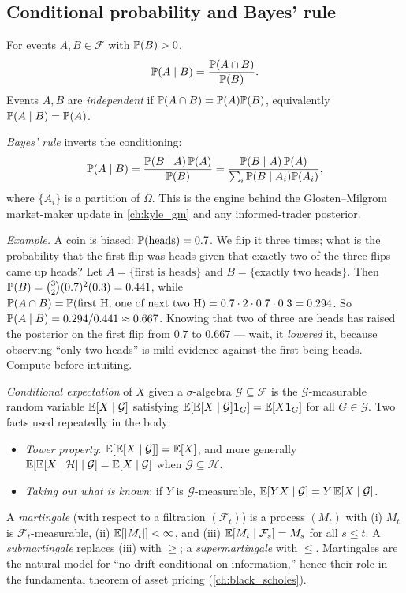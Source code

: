 \subsection{Conditional probability and Bayes' rule}

For events $A, B \in \mathcal{F}$ with $\mathbb{P}(B) > 0$,
\[
\mathbb{P}(A \mid B) = \frac{\mathbb{P}(A \cap B)}{\mathbb{P}(B)}.
\]
Events $A,B$ are \emph{independent} if $\mathbb{P}(A \cap B) = \mathbb{P}(A)\mathbb{P}(B)$,
equivalently $\mathbb{P}(A \mid B) = \mathbb{P}(A)$.

\emph{Bayes' rule} inverts the conditioning:
\[
\mathbb{P}(A \mid B) = \frac{\mathbb{P}(B \mid A)\,\mathbb{P}(A)}{\mathbb{P}(B)}
                = \frac{\mathbb{P}(B \mid A)\,\mathbb{P}(A)}
                       {\sum_i \mathbb{P}(B \mid A_i)\mathbb{P}(A_i)},
\]
where $\{A_i\}$ is a partition of $\Omega$. This is the engine behind
the Glosten--Milgrom market-maker update in \cref{ch:kyle_gm} and any
informed-trader posterior.

\emph{Example.} A coin is biased: $\mathbb{P}(\text{heads}) = 0.7$. We flip it
three times; what is the probability that the first flip was heads given
that exactly two of the three flips came up heads? Let $A = \{\text{first
is heads}\}$ and $B = \{\text{exactly two heads}\}$. Then
$\mathbb{P}(B) = \binom{3}{2}(0.7)^2(0.3) = 0.441$, while
$\mathbb{P}(A \cap B) = \mathbb{P}(\text{first H, one of next two H})
= 0.7 \cdot 2 \cdot 0.7 \cdot 0.3 = 0.294$. So
$\mathbb{P}(A \mid B) = 0.294 / 0.441 \approx 0.667$. Knowing that two of
three are heads has raised the posterior on the first flip from $0.7$
to $0.667$ --- wait, it \emph{lowered} it, because observing ``only
two heads'' is mild evidence against the first being heads. Compute
before intuiting.

\emph{Conditional expectation} of $X$ given a $\sigma$-algebra
$\mathcal{G} \subseteq \mathcal{F}$ is the $\mathcal{G}$-measurable
random variable $\mathbb{E}[X \mid \mathcal{G}]$ satisfying
$\mathbb{E}[\mathbb{E}[X \mid \mathcal{G}] \mathbf{1}_G] = \mathbb{E}[X \mathbf{1}_G]$ for all
$G \in \mathcal{G}$. Two facts used repeatedly in the body:
\begin{itemize}
  \item \emph{Tower property}: $\mathbb{E}[\mathbb{E}[X \mid \mathcal{G}]] = \mathbb{E}[X]$,
        and more generally $\mathbb{E}[\mathbb{E}[X \mid \mathcal{H}] \mid \mathcal{G}]
        = \mathbb{E}[X \mid \mathcal{G}]$ when $\mathcal{G} \subseteq \mathcal{H}$.
  \item \emph{Taking out what is known}: if $Y$ is $\mathcal{G}$-measurable,
        $\mathbb{E}[YX \mid \mathcal{G}] = Y\,\mathbb{E}[X \mid \mathcal{G}]$.
\end{itemize}
A \emph{martingale} (with respect to a filtration
$(\mathcal{F}_t)$) is a process $(M_t)$ with
(i) $M_t$ is $\mathcal{F}_t$-measurable, (ii) $\mathbb{E}[|M_t|] < \infty$, and
(iii) $\mathbb{E}[M_t \mid \mathcal{F}_s] = M_s$ for all $s \le t$.
A \emph{submartingale} replaces (iii) with $\ge$; a
\emph{supermartingale} with $\le$. Martingales are the natural model
for ``no drift conditional on information,'' hence their role in the
fundamental theorem of asset pricing (\cref{ch:black_scholes}).


